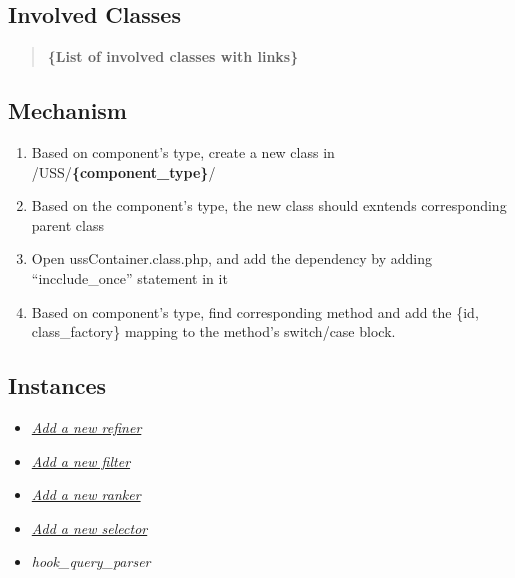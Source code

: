 \documentclass[letterpaper,10pt,english]{sphinxmanual}
\begin{document}
\subsection{Involved Classes}
\label{docs/hooks/t_uss_components:involved-classes}\begin{quote}

\textbf{\{List of involved classes with links\}}
\end{quote}


\subsection{Mechanism}
\label{docs/hooks/t_uss_components:mechanism}\begin{enumerate}
\item {} 
Based on component's type, create a new class in /USS/\textbf{\{component\_type\}}/

\item {} 
Based on the component's type, the new class should exntends corresponding parent class

\item {} 
Open ussContainer.class.php, and add the dependency by adding ``incclude\_once'' statement in it

\item {} 
Based on component's type, find corresponding method and add the \{id, class\_factory\} mapping to the method's switch/case block.

\end{enumerate}


\subsection{Instances}
\label{docs/hooks/t_uss_components:instances}\begin{itemize}
\item {} 
{\hyperref[docs/hooks/new_refiner:hook-refiner]{\emph{Add a new refiner}}}

\item {} 
{\hyperref[docs/hooks/new_filter:hook-filter]{\emph{Add a new filter}}}

\item {} 
{\hyperref[docs/hooks/new_ranker:hook-ranker]{\emph{Add a new ranker}}}

\item {} 
{\hyperref[docs/hooks/new_selector:hook-selector]{\emph{Add a new selector}}}

\item {} 
\emph{hook\_query\_parser}

\end{itemize}
\end{document}
